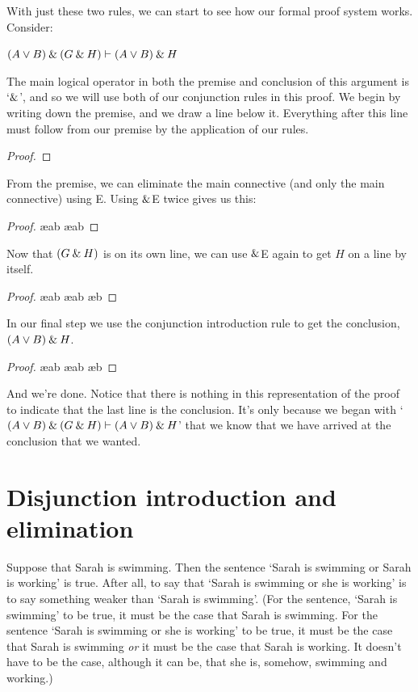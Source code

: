 With just these two rules, we can start to see how our formal proof system works. Consider:
\begin{earg}
\item[] $(A\vee B) \mathbin{\&} (G \mathbin{\&} H) \vdash (A\vee B)\mathbin{\&} H$
\end{earg}
The main logical operator in both the premise and conclusion of this argument is `$\mathbin{\&}$', and so we will use both of our conjunction rules in this proof. We begin by writing down the premise, and we draw a line below it. Everything after this line must follow from our premise by the application of our rules. 
\begin{proof}
	 \pr{}
\end{proof}
From the premise, we can eliminate the main connective (and only the main connective) using {\eand}E. Using $\mathbin{\&}$E twice gives us this:
\begin{proof}
	 \pr{}
	 \ae{ab}
	 \ae{ab}
\end{proof}
Now that $(G\mathbin{\&} H)$ is on its own line, we can use $\mathbin{\&}$E again to get $H$ on a line by itself. 
\begin{proof}
	 \pr{}
	 \ae{ab}
	 \ae{ab}
	 \ae{b}
\end{proof}
In our final step we use the conjunction introduction rule to get the conclusion, $(A\vee B)\mathbin{\&} H$.
\begin{proof}
	 \pr{}
	 \ae{ab}
	 \ae{ab}
	 \ae{b}
	 
\end{proof}
And we're done. Notice that there is nothing in this representation of the proof to indicate that the last line is the conclusion. It's only because we began with `$(A\vee B) \mathbin{\&} (G \mathbin{\&} H) \vdash (A\vee B)\mathbin{\&} H$' that we know that we have arrived at the conclusion that we wanted.
 

\section{Disjunction introduction and elimination}\label{s:disj-rule}
Suppose that Sarah is swimming. Then the sentence `Sarah is swimming or Sarah is working' is true. After all, to say that `Sarah is swimming or she is working' is to say something weaker than `Sarah is swimming'. (For the sentence, `Sarah is swimming' to be true, it must be the case that Sarah is swimming. For the sentence `Sarah is swimming or she is working' to be true, it must be the case that Sarah is swimming \textit{or} it must be the case that Sarah is working. It doesn't have to be the case, although it can be, that she is, somehow, swimming and working.)

